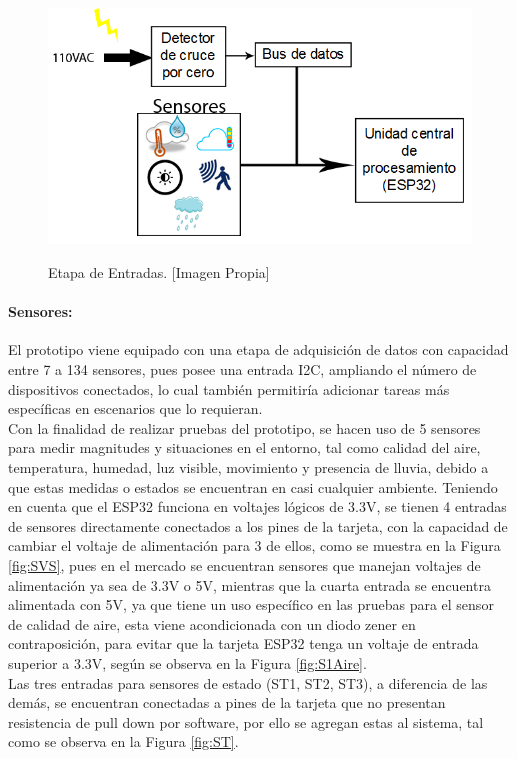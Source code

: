 	\begin{figure}[H]
		\centering
		\caption[Etapa de Entradas.]{Etapa de Entradas. [Imagen Propia]}
		\includegraphics[width=0.7\linewidth]{Imagenes/B_Entradas}\label{fig:BEntradas}
	\end{figure}
	
	\paragraph{Sensores:}
		El prototipo viene equipado con una etapa de adquisición de datos con capacidad entre 7 a 134 sensores, pues posee una entrada I2C, ampliando el número de dispositivos conectados, lo cual también permitiría adicionar tareas más específicas en escenarios que lo requieran.\\
		
		Con la finalidad de realizar pruebas del prototipo, se hacen uso de 5 sensores para medir magnitudes y situaciones en el entorno, tal como calidad del aire, temperatura, humedad, luz visible, movimiento y presencia de lluvia, debido a que estas medidas o estados se encuentran en casi cualquier ambiente. Teniendo en cuenta que el ESP32 funciona en voltajes lógicos de 3.3V, se tienen 4 entradas de sensores directamente conectados a los pines de la tarjeta, con la capacidad de cambiar el voltaje de alimentación para 3 de ellos, como se muestra en la Figura \ref{fig:SVS}, pues en el mercado se encuentran sensores que manejan voltajes de alimentación ya sea de 3.3V o 5V, mientras que la cuarta entrada se encuentra alimentada con 5V, ya que tiene un uso específico en las pruebas para el sensor de calidad de aire, esta viene acondicionada con un diodo zener en contraposición, para evitar que la tarjeta ESP32 tenga un voltaje de entrada superior a 3.3V, según se observa en la Figura \ref{fig:S1Aire}.\\
		
		Las tres entradas para sensores de estado (ST1, ST2, ST3), a diferencia de las demás, se encuentran conectadas a pines de la tarjeta que no presentan resistencia de pull down por software, por ello se agregan estas al sistema, tal como se observa en la Figura \ref{fig:ST}.\\
		
